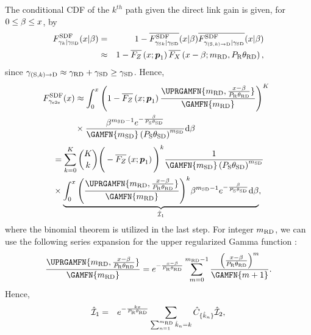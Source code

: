 \documentclass[10pt,journal]{IEEEtran}
\begin{document}
The conditional \ac{CDF} of the $k^{th}$ path given the direct link gain is given, for $0 \leq \beta\leq x$, by
\begin{eqnarray}
F_{\gamma_{k} \vert \gamma_{{\rm S} {\rm D}}}^{\rm SDF}(x \vert \beta)
&=& 1-\overline{F_{\gamma_{{\rm S} k} \vert \gamma_{{\rm S} {\rm D}}}^{\rm SDF}}(x \vert \beta) \overline{F_{\gamma_{({\rm S}, k)\rightarrow {\rm D}} \vert \gamma_{{\rm S} {\rm D}}}^{\rm SDF}}(x \vert \beta)\nonumber\\
&\approx &
1-\overline{F_{Z}}\left(x;\boldsymbol{p}_1\right)\overline{F_X}\left(x-\beta;{m_{{\rm R} {\rm D}}},P_{{\rm R}}{\theta_{{\rm R} {\rm D}}}\right), \nonumber
\end{eqnarray}
\noindent since $\gamma_{({\rm S}, k)\rightarrow {\rm D}} \approx \gamma_{{\rm R} {\rm D}} + \gamma_{{\rm S} {\rm D}} \geq \gamma_{{\rm S} {\rm D}}$. Hence,
\begin{equation}
\begin{split}
\!\!\!F_{\etoeFDSNR}^{\rm SDF}(\RVval)
&\approx
\int_0^\RVval \Bigg(
1-\overline{F_{Z}}\left(\RVval;\pv_1\right) \frac{\UPRGAMFN{\mrd,\frac{\RVval-\beta}{\PR\thetard}}}{\GAMFN{\mrd}}
\Bigg)^K
\\& \times
\frac{\beta^{\msd-1}e^{-\frac{\beta}{\PS\thetasd}}}{\GAMFN{\msd}\left(\PS\thetasd\right)^\msd} \mathrm{d}\beta
\end{split}
\end{equation}
\begin{equation}
\begin{split}
&=\sum_{k=0}^K {K \choose k} \Bigg(
-\overline{F_{Z}}\left(\RVval;\pv_1\right)\Bigg)^k \frac{1}{\GAMFN{\msd}\left(\PS\thetasd\right)^\msd}
\\
& \times \underbrace{\int_0^\RVval\Bigg(\frac{\UPRGAMFN{\mrd,\frac{\RVval-\beta}{\PR\thetard}}}{\GAMFN{\mrd}}
\Bigg)^k
\beta^{\msd-1}e^{-\frac{\beta}{\PS\thetasd}} \mathrm{d}\beta}_{\mathcal{{\hat{I}}}_1},%
\end{split}
\label{end_to_end_SNR_CDF_SDF_given_L_Nakagami_step}
\end{equation}
where the binomial theorem is utilized in the last step. For integer ${m_{{\rm R} {\rm D}}}$, we can use the following series expansion for the upper regularized Gamma function \cite[Eq. 8.352-2]{gradshteyn_ryzhik}:
\begin{equation}
\frac{\UPRGAMFN{\mrd,\frac{\RVval-\beta}{\PR\thetard}}}{\GAMFN{\mrd}}
=
e^{-\frac{\RVval-\beta}{\PR\thetard}}\sum_{m=0}^{\mrd-1}\frac{\left(\frac{\RVval-\beta}{\PR\thetard}\right)^m}{\GAMFN{m+1}}.\label{series_expan_upper_regularized_gamma_integer}
\end{equation}
Hence,
\begin{eqnarray}
\mathcal{\hat{I}}_1
&=& e^{-\frac{kx}{P_{{\rm R}}{\theta_{{\rm R} {\rm D}}}}} \sum_{\sum_{n=1}^{{m_{{\rm R} {\rm D}}}} \hat{k}_{n} = k} \hat{C}_{\{\hat{k}_n\}} \mathcal{\hat{I}}_2,\label{multinomial_theorem_applied_SDF}
\end{eqnarray}
\end{document}
